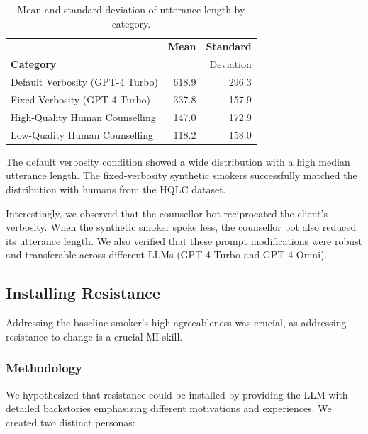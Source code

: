 \begin{table}[ht]
\centering

\begin{tabular}{lrr}
\toprule
{} &  \textbf{Mean} &  \textbf{Standard} \\
\textbf{Category}                   &                        &           {Deviation}          \\
\midrule
Default Verbosity (GPT-4 Turbo) &                  618.9 &               296.3 \\
Fixed Verbosity (GPT-4 Turbo)   &                  337.8 &               157.9 \\
High-Quality Human Counselling             &                  147.0 &               172.9 \\
Low-Quality Human Counselling            &                  118.2 &               158.0 \\
\bottomrule
\end{tabular}
\caption{Mean and standard deviation of utterance length by category.}
\label{tab:utterance_stats}
\end{table}

The default verbosity condition showed a wide distribution with a high median utterance length. The fixed-verbosity synthetic smokers successfully matched the distribution with humans from the HQLC dataset.

Interestingly, we observed that the counsellor bot reciprocated the client's verbosity. When the synthetic smoker spoke less, the counsellor bot also reduced its utterance length. We also verified that these prompt modifications were robust and transferable across different LLMs (GPT-4 Turbo and GPT-4 Omni).

\subsection{Installing Resistance}
\label{sec:synthetic-smoker-resistance}

Addressing the baseline smoker's high agreeableness was crucial, as addressing resistance to change is a crucial MI skill.

\subsubsection{Methodology}
We hypothesized that resistance could be installed by providing the LLM with detailed backstories emphasizing different motivations and experiences. We created two distinct personas:


